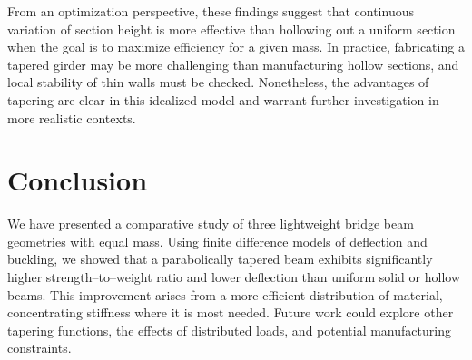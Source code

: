 \documentclass[11pt]{article}
\begin{document}
From an optimization perspective, these findings suggest that continuous
variation of section height is more effective than hollowing out a uniform
section when the goal is to maximize efficiency for a given mass.  In
practice, fabricating a tapered girder may be more challenging than
manufacturing hollow sections, and local stability of thin walls must be
checked.  Nonetheless, the advantages of tapering are clear in this
idealized model and warrant further investigation in more realistic
contexts.

\section{Conclusion}
\label{sec:conclusion}

We have presented a comparative study of three lightweight bridge beam
geometries with equal mass.  Using finite difference models of deflection
and buckling, we showed that a parabolically tapered beam exhibits
significantly higher strength--to--weight ratio and lower deflection than
uniform solid or hollow beams.  This improvement arises from a more
efficient distribution of material, concentrating stiffness where it is
most needed.  Future work could explore other tapering functions, the
effects of distributed loads, and potential manufacturing constraints.
\end{document}
